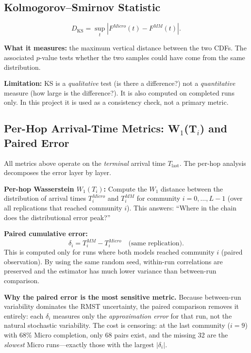 \documentclass[11pt,a4paper]{article}
\begin{document}
\subsection{Kolmogorov--Smirnov Statistic}

\[
  D_{\mathrm{KS}} = \sup_t |F^{Micro}(t) - F^{MM}(t)|.
\]

\textbf{What it measures:} the maximum vertical distance between the two CDFs.
The associated $p$-value tests whether the two samples could have come from
the same distribution.

\textbf{Limitation:} KS is a \emph{qualitative} test (is there a difference?)
not a \emph{quantitative} measure (how large is the difference?).  It is also
computed on completed runs only.  In this project it is used as a consistency
check, not a primary metric.

\subsection{Per-Hop Arrival-Time Metrics: W\texorpdfstring{$_1$}{1}(T\texorpdfstring{$_i$}{i}) and Paired Error}

All metrics above operate on the \emph{terminal} arrival time $T_{\mathrm{last}}$.
The per-hop analysis decomposes the error layer by layer.

\textbf{Per-hop Wasserstein $W_1(T_i)$:}
Compute the $W_1$ distance between the distribution of arrival times
$T_i^{Micro}$ and $T_i^{MM}$ for community $i = 0,\ldots,L-1$
(over all replications that reached community $i$).
This answers: ``Where in the chain does the distributional error peak?''

\textbf{Paired cumulative error:}
\[
  \delta_i = T_i^{MM} - T_i^{Micro} \quad \text{(same replication)}.
\]
This is computed only for runs where both models reached community $i$
(paired observation).  By using the same random seed, within-run correlations
are preserved and the estimator has much lower variance than between-run
comparison.

\textbf{Why the paired error is the most sensitive metric.}
Because between-run variability dominates the RMST uncertainty,
the paired comparison removes it entirely: each $\delta_i$ measures only
the \emph{approximation error} for that run, not the natural stochastic
variability.  The cost is censoring: at the last community ($i=9$) with
68\% Micro completion, only 68 pairs exist, and the missing 32 are the
\emph{slowest} Micro runs---exactly those with the largest $|\delta_i|$.
\end{document}
